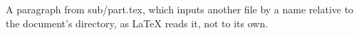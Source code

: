 A paragraph from sub/part.tex, which inputs another file by a name relative to
the document's directory, as LaTeX reads it, not to its own.


